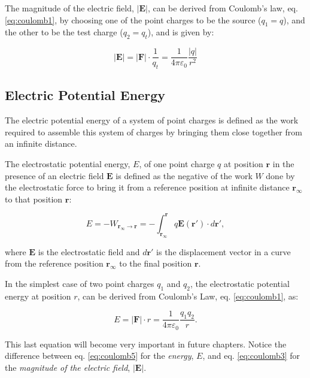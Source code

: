 \documentclass[
  english,
  9pt,
]{extbook}
\theoremstyle{definition}
\theoremstyle{definition}
\theoremstyle{definition}
\theoremstyle{definition}
\theoremstyle{remark}
\begin{document}
The magnitude of the electric field, \(|\mathbf{E}|\), can be derived from Coulomb's law, eq. \eqref{eq:coulomb1}, by choosing one of the point charges to be the source (\(q_1=q\)), and the other to be the test charge (\(q_2=q_t\)), and is given by:

\begin{equation}
{\displaystyle |\mathbf {E} |=|\mathbf{F}|\cdot \frac{1}{q_t}=\frac{1}{4\pi\varepsilon_0}{\frac {|q|}{r^{2}}}}
\label{eq:coulomb3}
\end{equation}

\subsection{Electric Potential Energy}\label{electric-potential-energy}

The electric potential energy of a system of point charges is defined as the work required to assemble this system of charges by bringing them close together from an infinite distance.

The electrostatic potential energy, \(E\), of one point charge \(q\) at position \(\mathbf{r}\) in the presence of an electric field \(\mathbf{E}\) is defined as the negative of the work \(W\) done by the electrostatic force to bring it from a reference position at infinite distance \(\mathbf{r}_{\infty}\) to that position \(\mathbf{r}\):

\begin{equation}
{\displaystyle E=-W_{\mathbf{r}_{\infty}\rightarrow \mathbf{r}}=-\int _{{\mathbf {r}}_{\infty}}^{\mathbf {r} }q\mathbf {E} (\mathbf {r'} )\cdot d \mathbf {r'} },
\label{eq:coulomb4}
\end{equation}

where \(\mathbf{E}\) is the electrostatic field and \(d\mathbf{r'}\) is the displacement vector in a curve from the reference position \(\mathbf{r}_{\infty}\) to the final position \(\mathbf{r}\).

In the simplest case of two point charges \(q_1\) and \(q_2\), the electrostatic potential energy at position \(r\), can be derived from Coulomb's Law, eq. \eqref{eq:coulomb1}, as:

\begin{equation}
{\displaystyle E=|\mathbf{F}|\cdot r = {\frac{1}{4\pi\varepsilon_0}}{\frac{q_1q_2}{r}}}.
\label{eq:coulomb5}
\end{equation}

This last equation will become very important in future chapters. Notice the difference between eq. \eqref{eq:coulomb5} for the \emph{energy}, \(E\), and eq. \eqref{eq:coulomb3} for the \emph{magnitude of the electric field}, \(|\mathbf{E}|\).
\end{document}
